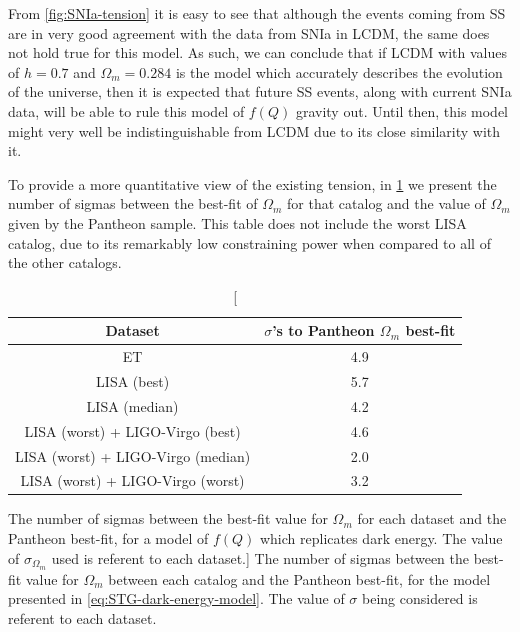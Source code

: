 From \cref{fig:SNIa-tension} it is easy to see that although the events coming from \gls{SS} are in very good agreement with the data from \gls{SNIa} in \gls{LCDM}, the same does not hold true for this model. As such, we can conclude that if \gls{LCDM} with values of $h = 0.7$ and $\Omega_m = 0.284$ is the model which accurately describes the evolution of the universe, then it is expected that future \gls{SS} events, along with current \gls{SNIa} data, will be able to rule this model of $f(Q)$ gravity out. Until then, this model might very well be indistinguishable from \gls{LCDM} due to its close similarity with it.

To provide a more quantitative view of the existing tension, in \cref{tab:SNIa-tensions} we present the number of sigmas between the best-fit of $\Omega_m$ for that catalog and the value of $\Omega_m$ given by the Pantheon sample. This table does not include the worst \gls{LISA} catalog, due to its remarkably low constraining power when compared to all of the other catalogs.

\begin{table}[h!]
    \centering
    \begin{tabular}{|c|c|}
        \hline
        Dataset                            & $\sigma$'s to Pantheon $\Omega_m$ best-fit \\ \hline
        ET                                 & 4.9                                        \\ \hline
        LISA (best)                        & 5.7                                        \\ \hline
        LISA (median)                      & 4.2                                        \\ \hline
        LISA (worst) + LIGO-Virgo (best)   & 4.6                                        \\ \hline
        LISA (worst) + LIGO-Virgo (median) & 2.0                                        \\ \hline
        LISA (worst) + LIGO-Virgo (worst)  & 3.2                                        \\ \hline
    \end{tabular}
    \caption
    [The number of sigmas between the best-fit value for $\Omega_m$ for each dataset and the Pantheon best-fit, for a model of $f(Q)$ which replicates dark energy. The value of $\sigma_{\Omega_m}$ used is referent to each dataset.]
    {The number of sigmas between the best-fit value for $\Omega_m$ between each catalog and the Pantheon best-fit, for the model presented in \cref{eq:STG-dark-energy-model}. The value of $\sigma$ being considered is referent to each dataset.}
    \label{tab:SNIa-tensions}
\end{table}



